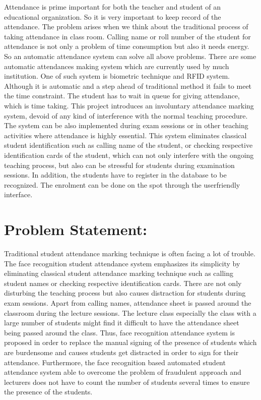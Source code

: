 Attendance is prime important for both the teacher and student of an educational organization. So it is very important to keep record of the attendance. The problem arises when we think about the traditional process of taking attendance in class room. 
Calling name or roll number of the student for attendance is not only a problem of time consumption but also it needs energy. So an automatic attendance system can solve all above problems. 
There are some automatic attendances making system which are currently used by much institution. One of such system is biometric technique and RFID system. Although it is automatic and a step ahead of traditional method it fails to meet the time constraint. The student has to wait in queue for giving attendance, which is time taking. 
This project introduces an involuntary attendance marking system, devoid of any kind of interference with the normal teaching procedure. The system can be also implemented during exam sessions or in other teaching activities where attendance is highly essential. This system eliminates classical student identification such as calling name of the student, or checking respective identification cards of the student, which can not only interfere with the ongoing teaching process, but also can be stressful for students during examination sessions. In addition, the students have to register in the database to be recognized. The enrolment can be done on the spot through the userfriendly interface. 
\newpage
\section{Problem Statement: }
Traditional student attendance marking technique is often facing a lot of trouble. The face recognition student attendance system emphasizes its simplicity by eliminating classical student attendance marking technique such as calling student names or checking respective identification cards. There are not only disturbing the teaching process but also causes distraction for students during exam sessions. Apart from calling names, attendance sheet is passed around the classroom during the lecture sessions. The lecture class especially the class with a large number of students might find it difficult to have the attendance sheet being passed around the class. Thus, face recognition attendance system is proposed in order to replace the manual signing of the presence of students which are burdensome and causes students get distracted in order to sign for their attendance. Furthermore, the face recognition based automated student attendance system able to overcome the problem of fraudulent approach and lecturers does not have to count the number of students several times to ensure the presence of the students. 
 
